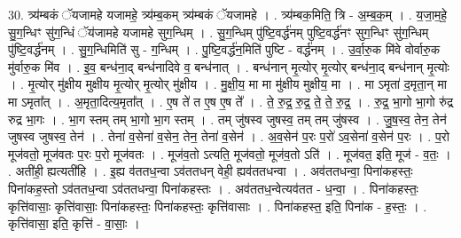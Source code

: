 \documentclass[17pt]{extarticle}
\begin{document}
30. त्र्य॑म्बकं ॅयजामहे यजामहे॒ त्र्य॑म्ब॒कम् त्र्य॑म्बकं ॅयजामहे । . त्र्य॑म्बक॒मिति॒ त्रि - अ॒म्ब॒क॒म् । . य॒जा॒म॒हे॒ सु॒ग॒न्धिꣳ सु॑ग॒न्धिं ॅय॑जामहे यजामहे सुग॒न्धिम् । . सु॒ग॒न्धिम् पु॑ष्टि॒वर्द्ध॑नम् पुष्टि॒वर्द्ध॑नꣳ सुग॒न्धिꣳ सु॑ग॒न्धिम् पु॑ष्टि॒वर्द्ध॑नम् । . सु॒ग॒न्धिमिति॑ सु - ग॒न्धिम् । . पु॒ष्टि॒वर्द्ध॑न॒मिति॑ पुष्टि - वर्द्ध॑नम् । . उ॒र्वा॒रु॒क मि॑वे वोर्वारु॒क मु॑र्वारु॒क मि॑व । . इ॒व॒ बन्ध॑ना॒द् बन्ध॑नादिवे व॒ बन्ध॑नात् । . बन्ध॑नान् मृ॒त्योर् मृ॒त्योर् बन्ध॑ना॒द् बन्ध॑नान् मृ॒त्योः । . मृ॒त्योर् मु॑क्षीय मुक्षीय मृ॒त्योर् मृ॒त्योर् मु॑क्षीय । . मु॒क्षी॒य॒ मा मा मु॑क्षीय मुक्षीय॒ मा । . मा ऽमृता॑ द॒मृता॒न् मा मा ऽमृता᳚त् । . अ॒मृता॒दित्य॒मृता᳚त् । . ए॒ष ते॑ त ए॒ष ए॒ष ते᳚ । . ते॒ रु॒द्र॒ रु॒द्र॒ ते॒ ते॒ रु॒द्र॒ । . रु॒द्र॒ भा॒गो भा॒गो रु॑द्र रुद्र भा॒गः । . भा॒ग स्तम् तम् भा॒गो भा॒ग स्तम् । . तम् जु॑षस्व जुषस्व॒ तम् तम् जु॑षस्व । . जु॒ष॒स्व॒ तेन॒ तेन॑ जुषस्व जुषस्व॒ तेन॑ । . तेना॑ व॒सेना॑ व॒सेन॒ तेन॒ तेना॑ व॒सेन॑ । . अ॒व॒सेन॑ प॒रः प॒रो॑ ऽव॒सेना॑ व॒सेन॑ प॒रः । . प॒रो मूज॑वतो॒ मूज॑वतः प॒रः प॒रो मूज॑वतः । . मूज॑व॒तो ऽत्यति॒ मूज॑वतो॒ मूज॑व॒तो ऽति॑ । . मूज॑वत॒ इति॒ मूज॑ - व॒तः॒ । . अती॑ही॒ ह्यत्यती॑हि । . इ॒ह्य व॑ततध॒न्वा ऽव॑ततधन् वेही॒ ह्यव॑ततधन्वा । . अव॑ततधन्वा॒ पिना॑कहस्तः॒ पिना॑कह॒स्तो ऽव॑ततध॒न्वा ऽव॑ततधन्वा॒ पिना॑कहस्तः । . अव॑ततध॒न्वेत्यव॑तत - ध॒न्वा॒ । . पिना॑कहस्तः॒ कृत्ति॑वासाः॒ कृत्ति॑वासाः॒ पिना॑कहस्तः॒ पिना॑कहस्तः॒ कृत्ति॑वासाः । . पिना॑कहस्त॒ इति॒ पिना॑क - ह॒स्तः॒ । . कृत्ति॑वासा॒ इति॒ कृत्ति॑ - वा॒साः॒ । \newline
\end{document}
